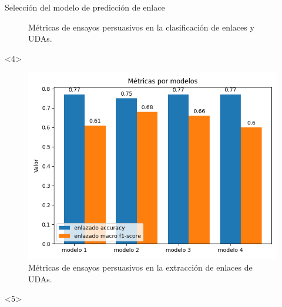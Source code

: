 \documentclass{beamer}
\begin{document}
\begin{frame}{Selección del modelo de predicción de enlace}
\begin{onlyenv}
\begin{figure}
            \caption{Métricas de ensayos persuasivos en la clasificación de enlaces y UDAs.}
        \end{figure}
    \end{onlyenv}
    \begin{onlyenv}<4>
        \begin{figure}
            \includegraphics[scale=0.6]{Graphics/persuasive_essays_all_linked_all_relation_linked.png}
            \caption{Métricas de ensayos persuasivos en la extracción de enlaces de UDAs.}
        \end{figure}
    \end{onlyenv}
    \begin{onlyenv}<5>
        \begin{table}
            \begin{center}
\end{center}
\end{table}
\end{onlyenv}
\end{frame}
\end{document}
